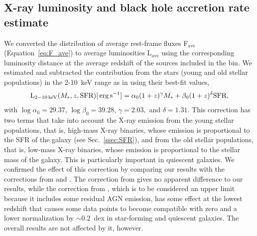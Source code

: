 \subsection{X-ray luminosity and black hole accretion rate estimate}
We converted the distribution of average rest-frame fluxes F$_\text{ave}$  %
(Equation~\ref{eq:F_ave}) to average luminosities L$_\text{ave}$ %
 using the corresponding luminosity distance at the average redshift of the sources included in the bin. We estimated and subtracted the contribution from the stars (young and old stellar populations) in the 2-10~keV range as in \citet{2016ApJ...825....7L} using their best-fit values,
\begin{equation}  \label{eq:XSFR}
\centering
\text{L}_{2-10\um{keV}}(M_*,z,\text{SFR})[\um{erg}\ump{s}{-1}]=\alpha_0(1+z)^\gamma M_*+\beta_0(1+z)^\delta \text{SFR}
,\end{equation}
with $\log\alpha_0=29.37$, $\log\beta_0=39.28$, $\gamma= 2.03,$ and $\delta=1.31$. This correction has two terms that take into account the X-ray emission from the young stellar populations, that is, high-mass X-ray binaries, whose emission is proportional to the SFR of the galaxy (see Sec.~\ref{ssec:SFR}), and from the old stellar populations, that is, low-mass X-ray binaries, whose emission is proportional to the stellar mass of the galaxy. This is particularly important in quiescent galaxies. We confirmed the effect of this correction by comparing our results with the corrections  from \citet{2018ApJ...865...43F} and \citet{2017MNRAS.465.3390A}. The correction from \citet{2017MNRAS.465.3390A} gives no apparent difference to our results, while the correction from \citeauthor{2018ApJ...865...43F}, which is to be considered an upper limit because it includes some residual AGN emission, has some effect at the lowest redshift that causes some data points to become compatible with zero and a lower normalization by $\sim0.2$~dex in star-forming and quiescent galaxies. The overall results are not affected by it, however.


